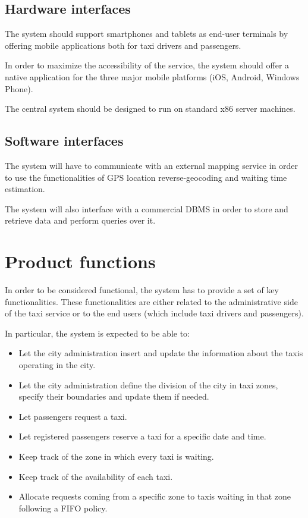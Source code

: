 \subsection{Hardware interfaces}
The system should support smartphones and tablets as end-user terminals by offering mobile applications both for taxi drivers and passengers.

In order to maximize the accessibility of the service, the system should offer a native application for the three major mobile platforms (iOS, Android, Windows Phone).

The central system should be designed to run on standard x86 server machines.


\subsection{Software interfaces}
The system will have to communicate with an external mapping service in order to use the functionalities of GPS location reverse-geocoding and waiting time estimation.

The system will also interface with a commercial DBMS in order to store and retrieve data and perform queries over it.


\section{Product functions}
In order to be considered functional, the system has to provide a set of key functionalities.
These functionalities are either related to the administrative side of the taxi service or to the end users (which include taxi drivers and passengers).

In particular, the system is expected to be able to:
\begin{itemize}
\item Let the city administration insert and update the information about the taxis operating in the city.
\item Let the city administration define the division of the city in taxi zones, specify their boundaries and update them if needed.
\item Let passengers request a taxi.
\item Let registered passengers reserve a taxi for a specific date and time.
\item Keep track of the zone in which every taxi is waiting.
\item Keep track of the availability of each taxi.
\item Allocate requests coming from a specific zone to taxis waiting in that zone following a FIFO policy.
\end{itemize}

